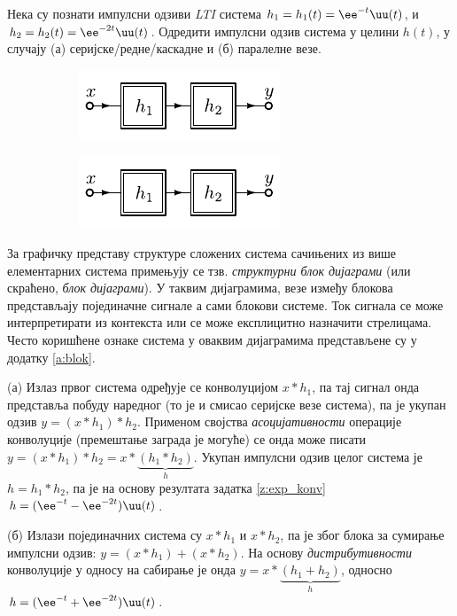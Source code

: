 \PID 
Нека су познати импулсни одзиви \textit{LTI} система 
 $h_1 = h_1(t) = \ee^{-t} \uu(t)$, и $h_2 = h_2(t) = \ee^{-2t} \uu(t)$. Одредити 
импулсни одзив система у целини $h(t)$, у случају (а) серијске/редне/каскадне и (б) паралелне везе. 
\begin{figure}[ht!]
    \begin{subfigure}{0.5\textwidth}
        \centering
        \includegraphics[page=1]{fig/ser_par.pdf}
        \caption{}
    \end{subfigure}
    \begin{subfigure}{0.5\textwidth}
        \centering
        \includegraphics[page=2]{fig/ser_par.pdf}
        \caption{}
    \end{subfigure}
    \caption{}
\end{figure}

\RESENJE

За графичку представу структуре сложених система сачињених из више елементарних система примењују се тзв. \textit{структурни блок дијаграми}
(или скраћено, \textit{блок дијаграми}). У таквим дијаграмима, везе између блокова представљају појединачне сигнале а сами блокови системе.
Ток сигнала се може интерпретирати из контекста или се може експлицитно назначити стрелицама. Често коришћене ознаке система у оваквим дијаграмима 
представљене су у додатку \ref{a:blok}.

(а) Излаз првог система одређује се конволуцијом $x \ast h_1$, па тај сигнал онда представља побуду наредног (то је и смисао серијске везе система), 
па је укупан одзив $y = (x \ast h_1) \ast h_2$. Применом својства \textit{асоцијативности} операције конволуције (премештање заграда је 
могуће) се онда може писати 
$y =(x \ast h_1) \ast h_2 = x \ast \underbrace{( h_1 \ast h_2)}_{h}$. Укупан импулсни одзив целог система је
$h = h_1 \ast h_2$, па је на основу резултата задатка \ref{z:exp_konv} $h = (\ee^{-t} - \ee^{-2t}) \uu(t)$. 

(б) Излази појединачних система су $x \ast h_1$ и $x \ast h_2$, па је због блока за сумирање импулсни одзив: 
$y = (x \ast h_1) + (x \ast h_2)$. На основу \textit{дистрибутивности} конволуције у односу на сабирање је онда 
$y = x \ast \underbrace{(h_1 + h_2)}_h$, односно $h = (\ee^{-t} + \ee^{-2t}) \uu(t)$.

